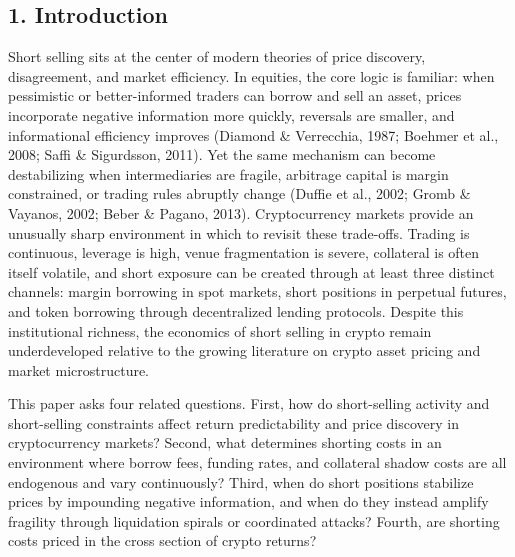 \documentclass[
]{article}
\begin{document}
\subsection{1. Introduction}\label{1-introduction}

Short selling sits at the center of modern theories of price discovery,
disagreement, and market efficiency. In equities, the core logic is
familiar: when pessimistic or better-informed traders can borrow and
sell an asset, prices incorporate negative information more quickly,
reversals are smaller, and informational efficiency improves (Diamond \&
Verrecchia, 1987; Boehmer et al., 2008; Saffi \& Sigurdsson, 2011). Yet
the same mechanism can become destabilizing when intermediaries are
fragile, arbitrage capital is margin constrained, or trading rules
abruptly change (Duffie et al., 2002; Gromb \& Vayanos, 2002; Beber \&
Pagano, 2013). Cryptocurrency markets provide an unusually sharp
environment in which to revisit these trade-offs. Trading is continuous,
leverage is high, venue fragmentation is severe, collateral is often
itself volatile, and short exposure can be created through at least
three distinct channels: margin borrowing in spot markets, short
positions in perpetual futures, and token borrowing through
decentralized lending protocols. Despite this institutional richness,
the economics of short selling in crypto remain underdeveloped relative
to the growing literature on crypto asset pricing and market
microstructure.

This paper asks four related questions. First, how do short-selling
activity and short-selling constraints affect return predictability and
price discovery in cryptocurrency markets? Second, what determines
shorting costs in an environment where borrow fees, funding rates, and
collateral shadow costs are all endogenous and vary continuously? Third,
when do short positions stabilize prices by impounding negative
information, and when do they instead amplify fragility through
liquidation spirals or coordinated attacks? Fourth, are shorting costs
priced in the cross section of crypto returns?
\end{document}
